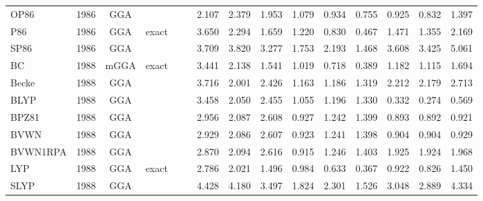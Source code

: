 \begin{landscape}
\begin{longtable}{lc:cccc:rrr:rrr:rrr}
    OP86             & 1986 & GGA  &          &             &           & 2.107             & 2.379             & 1.953  & 1.079              & 0.934             & 0.755  & 0.925   & 0.832 & 1.397 \\
    P86              & 1986 & GGA  & exact    &             &           & 3.650             & 2.294             & 1.659  & 1.220              & 0.830             & 0.467  & 1.471   & 1.355 & 2.169 \\
    SP86             & 1986 & GGA  &          &             &           & 3.709             & 3.820             & 3.277  & 1.753              & 2.193             & 1.468  & 3.608   & 3.425 & 5.061 \\
    BC               & 1988 & mGGA & exact    &             &           & 3.441             & 2.138             & 1.541  & 1.019              & 0.718             & 0.389  & 1.182   & 1.115 & 1.694 \\
    Becke            & 1988 & GGA  &          &             &           & 3.716             & 2.001             & 2.426  & 1.163              & 1.186             & 1.319  & 2.212   & 2.179 & 2.713 \\
    BLYP             & 1988 & GGA  &          &             &           & 3.458             & 2.050             & 2.455  & 1.055              & 1.196             & 1.330  & 0.332   & 0.274 & 0.569 \\
    BPZ81            & 1988 & GGA  &          &             &           & 2.956             & 2.087             & 2.608  & 0.927              & 1.242             & 1.399  & 0.893   & 0.892 & 0.921 \\
    BVWN             & 1988 & GGA  &          &             &           & 2.929             & 2.086             & 2.607  & 0.923              & 1.241             & 1.398  & 0.904   & 0.904 & 0.929 \\
    BVWN1RPA         & 1988 & GGA  &          &             &           & 2.870             & 2.094             & 2.616  & 0.915              & 1.246             & 1.403  & 1.925   & 1.924 & 1.968 \\
    LYP              & 1988 & GGA  & exact    &             &           & 2.786             & 2.021             & 1.496  & 0.984              & 0.633             & 0.367  & 0.922   & 0.826 & 1.450 \\
    SLYP             & 1988 & GGA  &          &             &           & 4.428             & 4.180             & 3.497  & 1.824              & 2.301             & 1.526  & 3.048   & 2.889 & 4.334 \\

\end{longtable}
\end{landscape}
